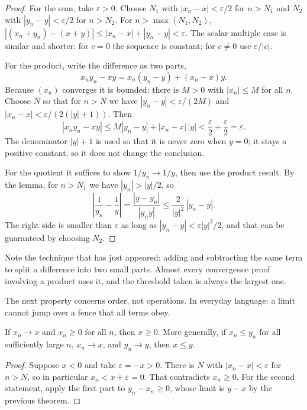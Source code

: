 \begin{proof}
For the sum, take $\varepsilon>0$. Choose $N_1$ with $|x_n-x|<\varepsilon/2$ for
$n>N_1$ and $N_2$ with $|y_n-y|<\varepsilon/2$ for $n>N_2$. For
$n>\max(N_1,N_2)$,
$|(x_n+y_n)-(x+y)| \le |x_n-x|+|y_n-y| < \varepsilon$. The scalar multiple case is
similar and shorter: for $c=0$ the sequence is constant; for $c \neq 0$ use
$\varepsilon/|c|$.

For the product, write the difference as two parts,
\[
x_n y_n - xy = x_n(y_n-y) + (x_n-x)y .
\]
Because $(x_n)$ converges it is bounded: there is $M>0$ with $|x_n| \le M$ for all
$n$. Choose $N$ so that for $n>N$ we have $|y_n-y|<\varepsilon/(2M)$ and
$|x_n-x|<\varepsilon/(2(|y|+1))$. Then
\[
|x_n y_n - xy| \le M|y_n-y| + |x_n-x|\,|y| < \frac{\varepsilon}{2}
+ \frac{\varepsilon}{2} = \varepsilon .
\]
The denominator $|y|+1$ is used so that it is never zero when $y=0$; it stays a
positive constant, so it does not change the conclusion.

For the quotient it suffices to show $1/y_n \to 1/y$, then use the product result.
By the lemma, for $n>N_1$ we have $|y_n|>|y|/2$, so
\[
\left|\frac{1}{y_n}-\frac{1}{y}\right| = \frac{|y-y_n|}{|y_n y|}
\le \frac{2}{|y|^2}\,|y_n-y| .
\]
The right side is smaller than $\varepsilon$ as long as $|y_n-y|<\varepsilon|y|^2/2$,
and that can be guaranteed by choosing $N_2$.
\end{proof}

Note the technique that has just appeared: adding and subtracting the same term to
split a difference into two small parts. Almost every convergence proof involving a
product uses it, and the threshold taken is always the largest one.

The next property concerns order, not operations. In everyday language: a limit
cannot jump over a fence that all terms obey.

\begin{teorema}
If $x_n \to x$ and $x_n \ge 0$ for all $n$, then $x \ge 0$. More generally, if
$x_n \le y_n$ for all sufficiently large $n$, $x_n \to x$, and $y_n \to y$, then
$x \le y$.
\end{teorema}

\begin{proof}
Suppose $x<0$ and take $\varepsilon=-x>0$. There is $N$ with $|x_n-x|<\varepsilon$
for $n>N$, so in particular $x_n < x+\varepsilon = 0$. That contradicts
$x_n \ge 0$. For the second statement, apply the first part to $y_n-x_n \ge 0$,
whose limit is $y-x$ by the previous theorem.
\end{proof}

